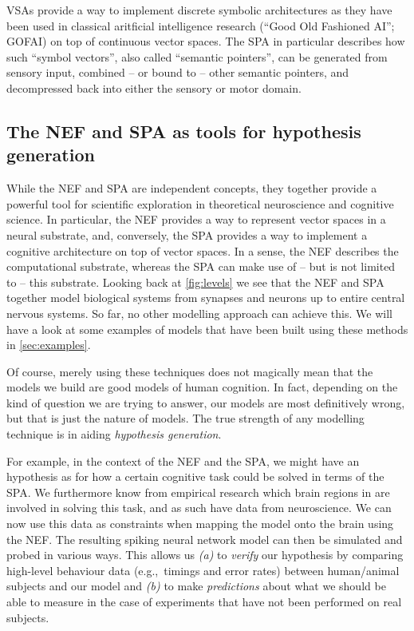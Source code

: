 \documentclass[10pt,letterpaper,oneside]{article}
\begin{document}
VSAs provide a way to implement discrete symbolic architectures as they have been used in classical aritficial intelligence research (\enquote{Good Old Fashioned AI}; GOFAI) on top of continuous vector spaces. The SPA in particular describes how such \enquote{symbol vectors}, also called \enquote{semantic pointers}, can be generated from sensory input, combined -- or bound to -- other semantic pointers, and decompressed back into either the sensory or motor domain.

\subsection{The NEF and SPA as tools for hypothesis generation}
While the NEF and SPA are independent concepts, they together provide a powerful tool for scientific exploration in theoretical neuroscience and cognitive science. In particular, the NEF provides a way to represent vector spaces in a neural substrate, and, conversely, the SPA provides a way to implement a cognitive architecture on top of vector spaces. In a sense, the NEF describes the computational substrate, whereas the SPA can make use of -- but is not limited to -- this substrate. Looking back at \cref{fig:levels} we see that the NEF and SPA together model biological systems from synapses and neurons up to entire central nervous systems. So far, no other modelling approach can achieve this. We will have a look at some examples of models that have been built using these methods in \cref{sec:examples}.

Of course, merely using these techniques does not magically mean that the models we build are good models of human cognition. In fact, depending on the kind of question we are trying to answer, our models are most definitively wrong, but that is just the nature of models. The true strength of any modelling technique is in aiding \emph{hypothesis generation}.

For example, in the context of the NEF and the SPA, we might have an hypothesis as for how a certain cognitive task could be solved in terms of the SPA. We furthermore know from empirical research which brain regions in are involved in solving this task, and as such have data from neuroscience. We can now use this data as constraints when mapping the model onto the brain using the NEF. The resulting spiking neural network model can then be simulated and probed in various ways. This allows us \emph{(a)} to \emph{verify} our hypothesis by comparing high-level behaviour data (e.g.,~timings and error rates) between human/animal subjects and our model and \emph{(b)} to make \emph{predictions} about what we should be able to measure in the case of experiments that have not been performed on real subjects.
\end{document}
